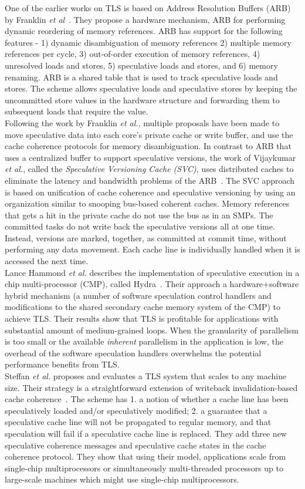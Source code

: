 \documentclass[10pt]{report}          %
\begin{document}
One of the earlier works on TLS is based on Address Resolution Buffers (ARB) by Franklin \textit{et al}~\cite{ARB}.  They propose a hardware mechanism, ARB for performing dynamic reordering of memory references.  ARB has support for the following features - 1) dynamic disambiguation of memory references 2) multiple memory references per cycle, 3) out-of-order execution of memory references, 4) unresolved loads and stores, 5) speculative loads and stores, and 6) memory renaming. ARB is a shared table that is used to track speculative loads and stores.  The scheme allows speculative loads and speculative stores by keeping the uncommitted store values in the hardware structure and forwarding them to subsequent loads that require the value.\\
Following the work by Franklin \textit{et al.}, multiple proposals have been made to move speculative data into each core's private cache or write buffer, and use the cache coherence protocols for memory disambiguation.   In contrast to ARB that uses a centralized buffer to support speculative versions, the work of Vijaykumar \textit{et al.}, called the \textit{Speculative Versioning Cache (SVC)}, uses distributed caches to eliminate the latency and bandwidth problems of the ARB~\cite{Gopal}. The SVC approach is based on unification of cache coherence and speculative versioning by using an organization similar to snooping bus-based coherent caches. Memory references that gets a hit in the private cache do not use the bus as in an SMPs. The committed tasks do not write back the speculative versions all at one time. Instead, versions are marked, together, as committed at commit time, without performing any data movement. Each cache line is individually handled when it is accessed the next time.\\
Lance Hammond \textit{et al.} describes the implementation of speculative execution in a chip multi-processor (CMP), called Hydra~\cite{Hydra}. Their approach a hardware+software hybrid mechanism (a number of software speculation control handlers and modifications to the shared secondary cache memory system of the CMP) to achieve TLS. Their results show that TLS is profitable for applications with substantial amount of medium-grained loops.  When the granularity of parallelism is too small or the available \textit{inherent} parallelism in the application is low, the overhead of the software speculation handlers overwhelms the potential performance benefits from TLS.\\
Steffan \textit{et al.} proposes and evaluates a TLS system that scales to any machine size.  Their strategy is a straightforward extension of writeback invalidation-based cache coherence~\cite{steffanISCA00}. The scheme has 1. a notion of whether a cache line has been speculatively loaded and/or speculatively modified; 2. a guarantee that a speculative cache line will not be propagated to regular memory, and that speculation will fail if a speculative cache line is replaced.  They add three new speculative coherence messages and speculative cache states in the cache coherence protocol.  They show that using their model, applications scale from single-chip multiprocessors or simultaneously multi-threaded processors up to large-scale machines which might use single-chip multiprocessors.\\
\end{document}
